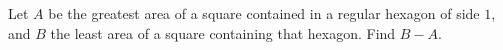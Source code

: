 Let $A$ be the greatest area of a square contained in a regular hexagon of side $1$, and $B$ the least area of a square containing that hexagon. Find $B-A$.
